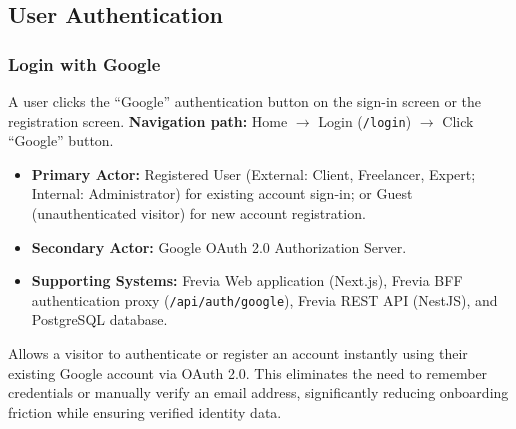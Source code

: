
\subsection{User Authentication}

\subsubsection{ Login with Google}

A user clicks the ``Google'' authentication button on the sign-in screen or the registration screen.\newline
\textbf{Navigation path:} Home $\rightarrow$ Login (\texttt{/login}) $\rightarrow$ Click ``Google'' button.


\begin{itemize}[leftmargin=1.6em,topsep=3pt,itemsep=2pt,parsep=0pt,label=$\bullet$]
    \item \textbf{Primary Actor:} Registered User (External: Client, Freelancer, Expert; Internal: Administrator) for existing account sign-in; or Guest (unauthenticated visitor) for new account registration.
    \item \textbf{Secondary Actor:} Google OAuth 2.0 Authorization Server.
    \item \textbf{Supporting Systems:} Frevia Web application (Next.js), Frevia BFF authentication proxy (\texttt{/api/auth/google}), Frevia REST API (NestJS), and PostgreSQL database.
\end{itemize}

\noindent Allows a visitor to authenticate or register an account instantly using their existing Google account via OAuth 2.0. This eliminates the need to remember credentials or manually verify an email address, significantly reducing onboarding friction while ensuring verified identity data.

